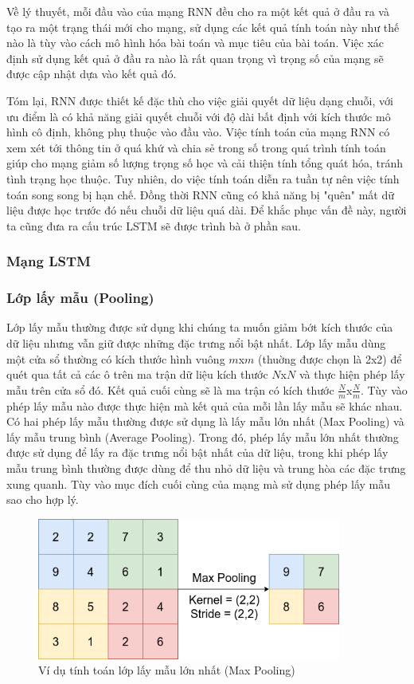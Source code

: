 Về lý thuyết, mỗi đầu vào của mạng RNN đều cho ra một kết quả ở đầu ra và tạo ra một trạng thái mới cho mạng, sử dụng các kết quả tính toán này như thế nào là tùy vào cách mô hình hóa bài toán và mục tiêu của bài toán. Việc xác định sử dụng kết quả ở đầu ra nào là rất quan trọng vì trọng số của mạng sẽ được cập nhật dựa vào kết quả đó.

Tóm lại, RNN được thiết kế đặc thù cho việc giải quyết dữ liệu dạng chuỗi, với ưu điểm là có khả năng giải quyết chuỗi với độ dài bất định với kích thước mô hình cô định, không phụ thuộc vào đầu vào. Việc tính toán của mạng RNN có xem xét tới thông tin ở quá khứ và chia sẻ trong số trong quá trình tính toán giúp cho mạng giảm số lượng trọng số học và cải thiện tính tổng quát hóa, tránh tình trạng học thuộc. Tuy nhiên, do việc tính toán diễn ra tuần tự nên việc tính toán song song bị hạn chế. Đồng thời RNN cũng có khả năng bị "quên" mất dữ liệu được học trước đó nếu chuỗi dữ liệu quá dài. Để khắc phục vấn đề này, người ta cũng đưa ra cấu trúc LSTM sẽ được trình bà ở phần sau.

\subsubsection{Mạng LSTM}

\subsubsection{Lớp lấy mẫu (Pooling)}

Lớp lấy mẫu thường được sử dụng khi chúng ta muốn giảm bớt kích thước của dữ liệu nhưng vẫn giữ được những đặc trưng nổi bật nhất. Lớp lấy mẫu dùng một cửa sổ thường có kích thước hình vuông $m$x$m$ (thuờng được chọn là 2x2) để quét qua tất cả các ô trên ma trận dữ liệu kích thước $N$x$N$ và thực hiện phép lấy mẫu trên cửa sổ đó. Kết quả cuối cùng sẽ là ma trận có kích thước $\frac{N}{m}$x$\frac{N}{m}$. Tùy vào phép lấy mẫu nào được thực hiện mà kết quả của mỗi lần lấy mẫu sẽ khác nhau. Có hai phép lấy mẫu thường được sử dụng là lấy mẫu lớn nhất (Max Pooling) và lấy mẫu trung bình (Average Pooling). Trong đó, phép lấy mẫu lớn nhất thường được sử dụng để lấy ra đặc trưng nổi bật nhất của dữ liệu, trong khi phép lấy mẫu trung bình thường được dùng để thu nhỏ dữ liệu và trung hòa các đặc trưng xung quanh. Tùy vào mục đích cuối cùng của mạng mà sử dụng phép lấy mẫu sao cho hợp lý.

\begin{figure}[H]
    \centering
    \includegraphics[width=10cm]{./content/materials/max_pooling.png}
    \caption{Ví dụ tính toán lớp lấy mẫu lớn nhất (Max Pooling)}
\end{figure}

